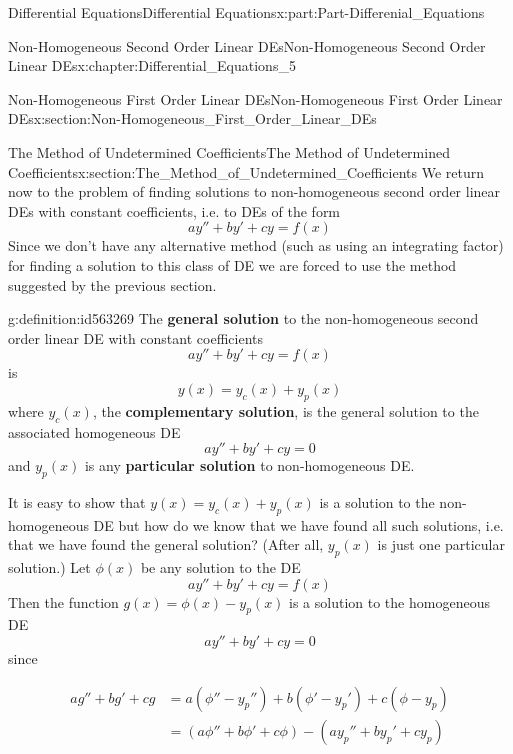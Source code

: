 \documentclass[oneside,10pt,]{book}
\newcommand{\terminology}[1]{\textbf{#1}}
\numberwithin{equation}{section}
\newcommand{\amp}{&}
\begin{document}
\begin{partptx}{Differential Equations}{}{Differential Equations}{}{}{x:part:Part-Differenial_Equations}
\begin{chapterptx}{Non-Homogeneous Second Order Linear DEs}{}{Non-Homogeneous Second Order Linear DEs}{}{}{x:chapter:Differential_Equations_5}
\begin{sectionptx}{Non-Homogeneous First Order Linear DEs}{}{Non-Homogeneous First Order Linear DEs}{}{}{x:section:Non-Homogeneous_First_Order_Linear_DEs}
\end{sectionptx}
%
%
\typeout{************************************************}
\typeout{************************************************}
%
\begin{sectionptx}{The Method of Undetermined Coefficients}{}{The Method of Undetermined Coefficients}{}{}{x:section:The_Method_of_Undetermined_Coefficients}
We return now to the problem of finding solutions to non-homogeneous second order linear DEs with constant coefficients, i.e. to DEs of the form%
\begin{equation*}
ay''+by'+cy=f(x)
\end{equation*}
Since we don’t have any alternative method (such as using an integrating factor) for finding a solution to this class of DE we are forced to use the method suggested by the previous section.%
\begin{definition}{}{g:definition:id563269}%
The \terminology{general solution} to the non-homogeneous second order linear DE with constant coefficients%
\begin{equation*}
ay''+by'+cy=f(x)
\end{equation*}
is%
\begin{equation*}
y(x)=y_c(x)+y_p(x)
\end{equation*}
where \(y_c(x)\), the \terminology{complementary solution}, is the general solution to the associated homogeneous DE%
\begin{equation*}
ay''+by'+cy=0
\end{equation*}
and \(y_p(x)\) is any \terminology{particular solution} to non-homogeneous DE.%
\end{definition}
It is easy to show that \(y(x)=y_c(x)+y_p(x)\) is a solution to the non-homogeneous DE but how do we know that we have found all such solutions, i.e. that we have found the general solution? (After all, \(y_p(x)\) is just one particular solution.) Let \(\phi(x)\) be any solution to the DE%
\begin{equation*}
ay''+by'+cy=f(x)
\end{equation*}
Then the function \(g(x)=\phi(x)-y_p(x)\) is a solution to the homogeneous DE%
\begin{equation*}
ay''+by'+cy=0
\end{equation*}
since%
\par
%
\begin{align*}
ag''+bg'+cg \amp = a(\phi''-y_p'')+b(\phi'-y_p')+c(\phi-y_p)\\
\amp = (a\phi''+b\phi'+c\phi)-(ay_p''+by_p'+cy_p)\\

\end{align*}
\end{sectionptx}
\end{chapterptx}
\end{partptx}
\end{document}
